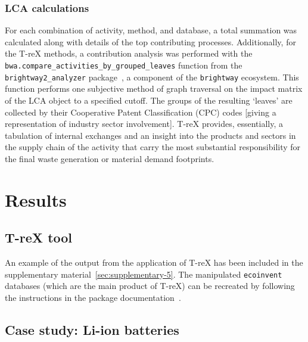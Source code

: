 \documentclass[a4paper,fleqn]{cas-dc}
\begin{document}
\subsubsection{LCA calculations}
For each combination of activity, method, and database, a total summation was
calculated along with details of the top contributing processes. Additionally,
for the T-reX methods, a contribution analysis was performed with the
\texttt{bwa.compare\_activities\_by\_grouped\_leaves} function from the
\texttt{brightway2\_analyzer} package~\citep{mutel2016brightway2analyzer}, a
component of the \texttt{brightway} ecosystem. This function performs one
subjective method of graph traversal on the impact matrix of the LCA object to
a specified cutoff. The groups of the resulting `leaves' are collected by their
Cooperative Patent Classification (CPC) codes [giving a representation of
industry sector involvement]. T-reX provides, essentially, a tabulation of
internal exchanges and an insight into the products and sectors in the supply
chain of the activity that carry the most substantial responsibility for the
final waste generation or material demand footprints.



\section{Results}\label{sec:results}
\subsection{T-reX tool}\label{sec:results-T-reX}

An example of the output from the application of T-reX has been included in the
supplementary material~\autoref{sec:supplementary-5}. The
manipulated \texttt{ecoinvent} databases (which are the main product of T-reX)
can be recreated by following the instructions in the package
documentation~\citep{mcdowall2023T-reXdocs}.

\subsection{Case study: Li-ion batteries}\label{sec:results-casestudy}
\end{document}

